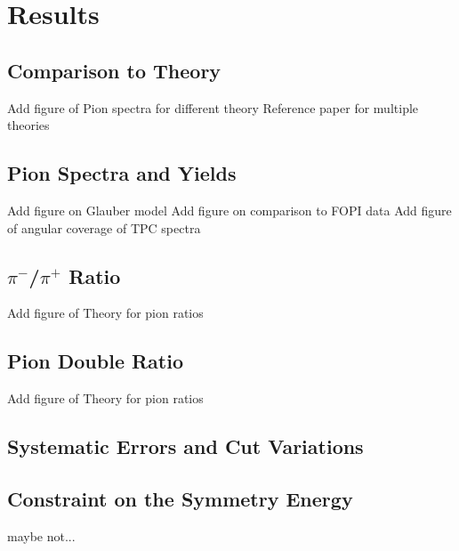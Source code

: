 \chapter{Results}
\section{Comparison to Theory}
Add figure of Pion spectra for different theory 
Reference paper for multiple theories
 
\section{Pion Spectra and Yields}
Add figure on Glauber model 
Add figure on comparison to FOPI data
Add figure of angular coverage of TPC spectra 

\section{$\pi^-$/$\pi^+$ Ratio}
Add figure of Theory for pion ratios

\section{Pion Double Ratio}
Add figure of Theory for pion ratios


\section{Systematic Errors and Cut Variations}
\label{sec:cutvar}

\section{Constraint on the Symmetry Energy}
maybe not...